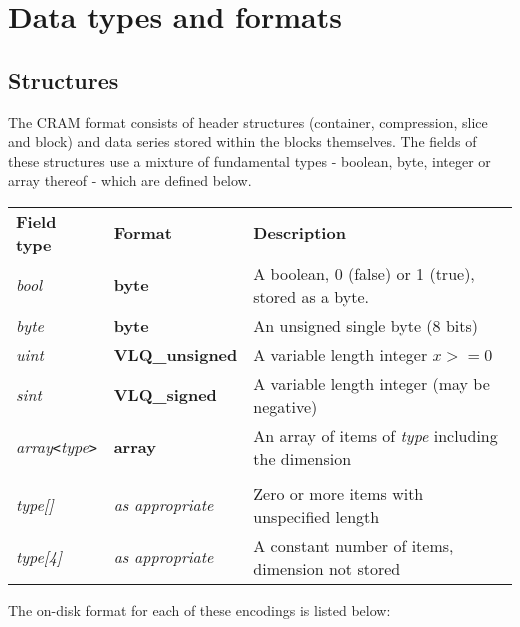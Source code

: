 \documentclass[a4paper]{article}
\begin{document}
\section{Data types and formats}
\subsection*{Structures}

The CRAM format consists of header structures (container, compression, slice and block) and data series stored within the blocks themselves.
The fields of these structures use a mixture of fundamental types - boolean, byte, integer or array thereof - which are defined below.


\begin{tabular}{lll}
\textbf{Field type}  & \textbf{Format} & \textbf{Description}\\
\textit{bool}  & \textbf{byte} & A boolean, 0 (false) or 1 (true), stored as a byte. \\
\textit{byte}  & \textbf{byte} & An unsigned single byte (8 bits)  \\
\textit{uint}  & \textbf{VLQ\_unsigned} & A variable length integer $x >= 0$\\
\textit{sint}  & \textbf{VLQ\_signed}   & A variable length integer (may be negative)\\
\textit{array\texttt{<}type\texttt{>}} & \textbf{array} & An array of items of \textit{type} including the dimension\\
\\
\textit{type[]}  & \textit{as appropriate} & Zero or more items with unspecified length\\
\textit{type[4]} & \textit{as appropriate} & A constant number of items, dimension not stored\\
\end{tabular}
\vskip 10pt

The on-disk format for each of these encodings is listed below:
\end{document}
